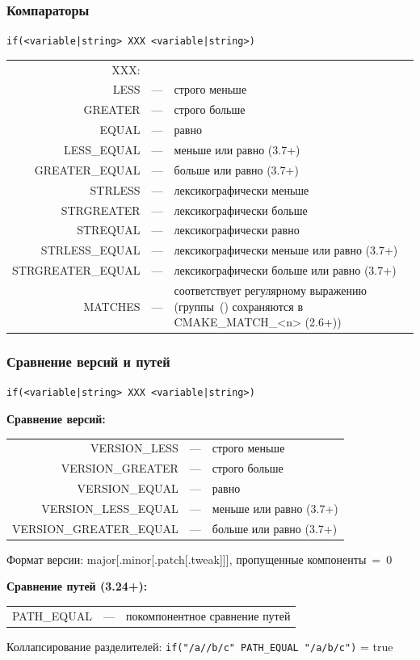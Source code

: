 \documentclass[10pt, aspectratio=1610]{beamer}
\begin{document}
\begin{frame}[fragile]\frametitle{Компараторы}
	

	\texttt{if(<variable|string> ХХХ <variable|string>)} 
	
	\hfill
	
	\begin{tabularx}{\textwidth}{>{\ttfamily}rcX}
		XXX: &&\\
		LESS & --- & строго меньше \\
		GREATER & --- & строго больше \\
		EQUAL & --- & равно \\
		LESS\_EQUAL & --- & меньше или равно (3.7+) \\
		GREATER\_EQUAL & --- & больше или равно (3.7+) \\
		STRLESS & --- & лексикографически меньше \\
		STRGREATER & --- & лексикографически больше \\
		STREQUAL & --- & лексикографически равно \\
		STRLESS\_EQUAL & --- & лексикографически меньше или равно (3.7+) \\
		STRGREATER\_EQUAL & --- & лексикографически больше или равно (3.7+) \\
		MATCHES & --- & соответствует регулярному выражению (группы~() сохраняются в CMAKE\_MATCH\_<n> (2.6+)) \\
	\end{tabularx}


	
	
\end{frame}

\begin{frame}[fragile]\frametitle{Сравнение версий и путей}
	
	\texttt{if(<variable|string> XXX <variable|string>)} 
	
	\hfill
	
	\textbf{Сравнение версий:}
	\begin{tabularx}{\textwidth}{>{\ttfamily}rcX}
		VERSION\_LESS & --- & строго меньше \\
		VERSION\_GREATER & --- & строго больше \\
		VERSION\_EQUAL & --- & равно \\
		VERSION\_LESS\_EQUAL & --- & меньше или равно (3.7+) \\
		VERSION\_GREATER\_EQUAL & --- & больше или равно (3.7+) \\
	\end{tabularx}
	
	\smallskip
	Формат версии: major[.minor[.patch[.tweak]]], пропущенные компоненты~=~0
	
	\hfill
	
	\textbf{Сравнение путей (3.24+):}
	\begin{tabularx}{\textwidth}{>{\ttfamily}rcX}
		PATH\_EQUAL & --- & покомпонентное сравнение путей \\
	\end{tabularx}
	
	\smallskip
	Коллапсирование разделителей:
	\texttt{if("/a//b/c" PATH_EQUAL "/a/b/c")} = true
	
\end{frame}
\end{document}
